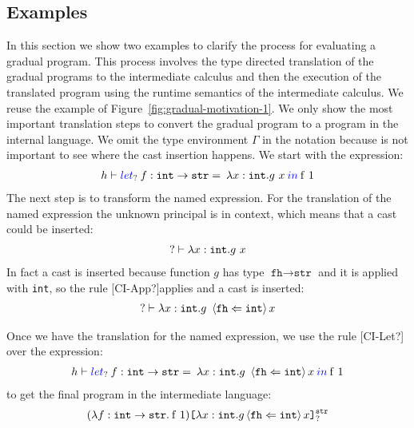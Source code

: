 \documentclass{article}
\newcommand{\emb}[3]{\texttt{[}#1\texttt{]}_{#2}^{#3}}
\newcommand{\tslam}[3]{\lambda #1 : #2. \: #3}
\newcommand{\plet}[5]{\textcolor[rgb]{0,0,1}{let}_{#1} \: {#2}:{#3} = \: #4 \: \textcolor[rgb]{0,0,1}{in} \: #5}
\newcommand{\knows}[2]{\left\langle #1 \Leftarrow #2 \right\rangle}
\newcommand\icode[1]{\texttt{#1}}
\newcommand\irname[1]{[#1]}
\begin{document}
\subsection{Examples}
In this section we show two examples to clarify the process for evaluating a gradual program. This process involves the type directed translation of the gradual programs to the intermediate calculus and then the execution of the translated program using the runtime semantics of the intermediate calculus. We reuse the example of Figure~\ref{fig:gradual-motivation-1}. We only show the most important translation steps to convert the gradual program to a program in the internal language. We omit the type environment $\Gamma$ in the notation because is not important to see where the cast insertion happens. We start with the expression:
\[
\begin{tabular}{c}
$h \vdash \plet{?}{f}{\icode{int} \rightarrow \icode{str}}{\lambda x: \icode{int}.g~x}{\mathrm{f~1}}$ \\
\end{tabular}
\]
The next step is to transform the named expression. For the translation of the named expression the unknown principal is in context, which means that a cast could be inserted:
\[
\begin{tabular}{c}
$? \vdash \lambda x: \icode{int}.g~x$
\end{tabular}
\]
In fact a cast is inserted because function $g$ has type $\icode{fh} \rightarrow \icode{str}$ and it is applied with \icode{int}, so the rule \irname{CI-App?}applies and a cast is inserted: 
\[
\begin{tabular}{c}
$? \vdash \lambda x: \icode{int}.g~\knows{\icode{fh}}{\icode{int}}x$
\end{tabular}
\]
	
Once we have the translation for the named expression, we use the rule \irname{CI-Let?} over the expression:
\[
\begin{tabular}{c}
$h \vdash \plet{?}{f}{\icode{int} \rightarrow \icode{str}}{\lambda x: \icode{int}.g~\knows{\icode{fh}}{\icode{int}}x}{\mathrm{f~1}}$ \\
\end{tabular}
\]
to get the final program in the intermediate language: 
\[
\begin{tabular}{c}
$(\tslam{f}{\icode{int} \rightarrow \icode{str}}{\mathrm{f~1}})\emb{\lambda x:\icode{int}.g \knows{\icode{fh}}{\icode{int}}x}{?}{\icode{str}}$ \\
\end{tabular}
\]
\end{document}
